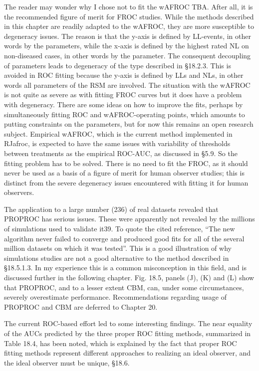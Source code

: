 \documentclass[
]{book}
\begin{document}
The reader may wonder why I chose not to fit the wAFROC TBA. After all, it is the recommended figure of merit for FROC studies. While the methods described in this chapter are readily adapted to the wAFROC, they are more susceptible to degeneracy issues. The reason is that the y-axis is defined by LL-events, in other words by the parameters, while the x-axis is defined by the highest rated NL on non-diseased cases, in other words by the parameter. The consequent decoupling of parameters leads to degeneracy of the type described in §18.2.3. This is avoided in ROC fitting because the y-axis is defined by LLs and NLs, in other words all parameters of the RSM are involved. The situation with the wAFROC is not quite as severe as with fitting FROC curves but it does have a problem with degeneracy. There are some ideas on how to improve the fits, perhaps by simultaneously fitting ROC and wAFROC-operating points, which amounts to putting constraints on the parameters, but for now this remains an open research subject. Empirical wAFROC, which is the current method implemented in RJafroc, is expected to have the same issues with variability of thresholds between treatments as the empirical ROC-AUC, as discussed in §5.9. So the fitting problem has to be solved. There is no need to fit the FROC, as it should never be used as a basis of a figure of merit for human observer studies; this is distinct from the severe degeneracy issues encountered with fitting it for human observers.

The application to a large number (236) of real datasets revealed that PROPROC has serious issues. These were apparently not revealed by the millions of simulations used to validate it39. To quote the cited reference, ``The new algorithm never failed to converge and produced good fits for all of the several million datasets on which it was tested''. This is a good illustration of why simulations studies are not a good alternative to the method described in §18.5.1.3. In my experience this is a common misconception in this field, and is discussed further in the following chapter. Fig. 18.5, panels (J), (K) and (L) show that PROPROC, and to a lesser extent CBM, can, under some circumstances, severely overestimate performance. Recommendations regarding usage of PROPROC and CBM are deferred to Chapter 20.

The current ROC-based effort led to some interesting findings. The near equality of the AUCs predicted by the three proper ROC fitting methods, summarized in Table 18.4, has been noted, which is explained by the fact that proper ROC fitting methods represent different approaches to realizing an ideal observer, and the ideal observer must be unique, §18.6.
\end{document}
